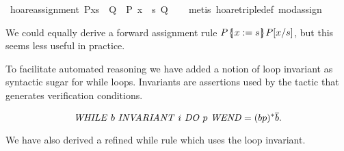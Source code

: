 \documentclass{llncs}
\newcommand{\llbrace}{\hspace{1pt} \lbrace \kern -3pt \vert \hspace{1pt}}
\newcommand{\rrbrace}{\hspace{0.5pt} \rbrace \kern -5pt \vert \hspace{3pt}}
\newcommand{\whileinv}[3]{\text{\textit{WHILE} $#1$ \textit{INVARIANT} $#2$ \textit{DO} $#3$ \textit{WEND}}}
\begin{document}
\begin{isabellebody}
\isanewline
{}\isamarkupfalse%
\ hoare{}assignment{}\ {}P{}x{}s{}\ {}\ Q\ {}\ {}P{}\ x\ {}{}\ s\ {}Q{}{}\isanewline
%
\isadelimproof
\ \ %
\endisadelimproof
%
\isatagproof
{}\isamarkupfalse%
\ {}metis\ hoare{}triple{}def\ mod{}assign{}%
\endisatagproof\isanewline
\end{isabellebody}

\noindent We could equally derive a forward assignment rule $P \llbrace x := s
\rrbrace P[x/s]$, but this seems less useful in practice.

To facilitate automated reasoning we have added a notion of loop
invariant as syntactic sugar for while loops. Invariants are
assertions used by the tactic that generates verification conditions.

\begin{equation*}
\whileinv{b}{i}{p} = (bp)^\ast \overline{b}.
\end{equation*}

\noindent We have also derived a refined while rule which uses the
loop invariant.
\end{document}
